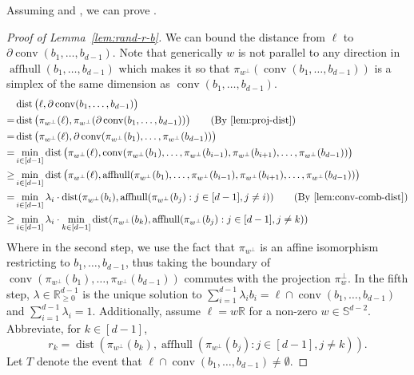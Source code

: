 \documentclass{theoretics}
\newcommand{\R}{\mathbb R}
\newcommand{\aff}{\operatorname{affhull}}
\newcommand{\conv}{\operatorname{conv}}
\newcommand{\dist}{\operatorname{dist}}
\begin{document}
Assuming  and , we can prove .

\begin{proof}[Proof of Lemma~\ref{lem:rand-r-b}]
    We can bound the distance from $\ell$ to $\partial \conv(b_1,\dots,b_{d-1})$.
    Note that generically $w$ is not parallel to any direction in $\aff(b_1,\dots,b_{d-1})$
    which makes it so that $\pi_{w^\perp}(\conv(b_1,\dots,b_{d-1}))$
    is a simplex of the same dimension as $\conv(b_1,\dots,b_{d-1})$.
    \begin{align*}
        & \dist \big(\ell, \partial \conv(b_1,\dots,b_{d-1}) \big) \\
        = & \dist \big(\pi_{w^\perp}(\ell), \pi_{w^\perp}(\partial \conv(b_1,\dots,b_{d-1})) \big) \tag{By \Cref{lem:proj-dist}} \\
        = & \dist \big(\pi_{w^\perp}(\ell), \partial \conv(\pi_{w^\perp}(b_1),\dots,\pi_{w^\perp}(b_{d-1})) \big) \\
        = & \min_{i \in [d-1]} \dist \big(\pi_{w^\perp}(\ell), \conv(\pi_{w^\perp}(b_1),\dots,\pi_{w^\perp}(b_{i-1}),\pi_{w^\perp}(b_{i+1}),\dots,\pi_{w^\perp}(b_{d-1})) \big) \\
        \geq & \min_{i \in [d-1]} \dist \big(\pi_{w^\perp}(\ell), \aff(\pi_{w^\perp}(b_1),\dots,\pi_{w^\perp}(b_{i-1}),\pi_{w^\perp}(b_{i+1}),\dots,\pi_{w^\perp}(b_{d-1})) \big) \\
        = & \min_{i \in [d-1]} \lambda_i \cdot \dist(\pi_{w^\perp}(b_i), \aff(\pi_{w^\perp}(b_j) : j \in [d-1], j \neq i)) \tag{By \Cref{lem:conv-comb-dist}}\\
        \geq & \min_{i \in [d-1]} \lambda_i \cdot  \min_{k \in [d-1]} \dist(\pi_{w^\perp}(b_k), \aff(\pi_{w^\perp}(b_j) : j \in [d-1], j \neq k))
    \end{align*}
    Where in the second step, we use the fact that $\pi_{w^{\perp}}$ is an affine isomorphism restricting to $b_{1}, \dots, b_{d-1}$, thus taking the boundary of $\conv(\pi_{w^\perp}(b_1),\dots,\pi_{w^\perp}(b_{d-1}))$ commutes with the projection $\pi_w^{\perp}$.
    In the fifth step,  $\lambda \in \R^{d-1}_{\geq 0}$ is the unique solution to $\sum_{i=1}^{d-1} \lambda_i b_i = \ell \cap \conv(b_1, \ldots, b_{d-1})$ and $\sum_{i=1}^{d-1} \lambda_i = 1$.
    Additionally, assume $\ell = w\R$ for a non-zero $w \in \mathbb{S}^{d-2}$.
    Abbreviate, for $k \in [d-1]$,
    $$r_k = \dist(\pi_{w^\perp}(b_k), \aff(\pi_{w^\perp}(b_j) : j \in [d-1], j \neq k)).$$
    Let $T$ denote the event that $\ell \cap \conv(b_1,\dots,b_{d-1}) \neq \emptyset$.

\end{proof}
\end{document}
